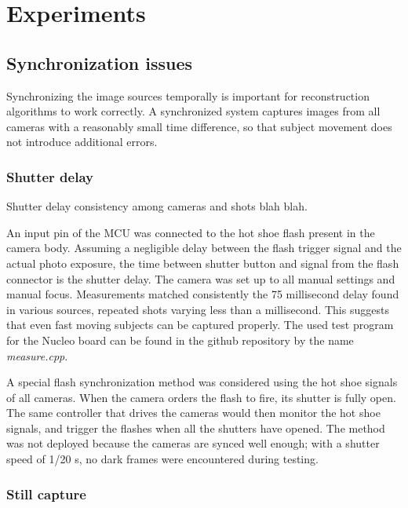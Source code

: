 \section{Experiments} \label{sec:experiments}


\subsection{Synchronization issues}

Synchronizing the image sources temporally is important for reconstruction algorithms to work correctly.
A synchronized system captures images from all cameras with a reasonably small time difference, so that subject movement does not introduce additional errors.

\subsubsection{Shutter delay} \label{sec:shutterdelaymeas}

Shutter delay consistency among cameras and shots blah blah.

An input pin of the MCU was connected to the hot shoe flash present in the camera body.
Assuming a negligible delay between the flash trigger signal and the actual photo exposure, the time between shutter button and signal from the flash connector is the shutter delay.
The camera was set up to all manual settings and manual focus.
Measurements matched consistently the 75 millisecond delay found in various sources, repeated shots varying less than a millisecond.
This suggests that even fast moving subjects can be captured properly.
The used test program for the Nucleo board can be found in the github repository by the name \emph{measure.cpp}.

A special flash synchronization method was considered using the hot shoe signals of all cameras.
When the camera orders the flash to fire, its shutter is fully open.
The same controller that drives the cameras would then monitor the hot shoe signals, and trigger the flashes when all the shutters have opened.
The method was not deployed because the cameras are synced well enough; with a shutter speed of 1/20 s, no dark frames were encountered during testing.

\subsubsection{Still capture}

